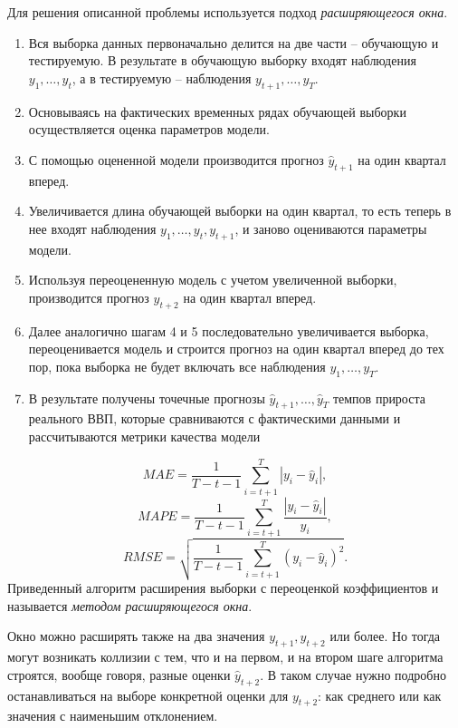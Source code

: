 \documentclass[a4paper, 14pt]{extreport}
\numberwithin{equation}{section}
\numberwithin{equation}{section}
\begin{document}
	Для решения описанной проблемы используется подход \textit{расширяющегося окна}.
	\begin{enumerate}
		\item Вся выборка данных первоначально делится на две части -- обучающую и тестируемую. В результате в обучающую
		выборку входят наблюдения $y_1,\ldots, y_t$, а в тестируемую -- наблюдения $y_{t+1},\ldots, y_T$.
		\item Основываясь на фактических временных рядах обучающей выборки осуществляется
		оценка параметров модели.
		\item С помощью оцененной модели производится прогноз $\hat y_{t+1}$ на один квартал вперед.
		\item Увеличивается длина обучающей выборки на один квартал, то есть теперь в нее входят наблюдения $y_1,\ldots, y_t, y_{t+1}$, и заново оцениваются
		параметры модели.
		\item Используя переоцененную модель с учетом увеличенной выборки, производится прогноз $\hat y_{t+2}$ на один квартал вперед.
		\item Далее аналогично шагам 4 и 5 последовательно увеличивается выборка, переоценивается модель и строится прогноз на один квартал вперед до тех пор, пока выборка не будет включать все наблюдения $y_{1},\ldots, y_T$.
		\item В результате получены точечные прогнозы $\hat y_{t+1},\ldots, \hat y_T$ темпов прироста реального ВВП, которые сравниваются с фактическими данными и рассчитываются метрики качества модели
	\end{enumerate}
		\begin{equation*}
		MAE = \dfrac{1}{T - t - 1} \sum_{i=t+1}^{T}|y_{i} - \hat y_{i}|,
	\end{equation*}
	\begin{equation*}
		MAPE = \dfrac{1}{T - t - 1} \sum_{i=t+1}^{T}\dfrac{|y_{i} - \hat y_{i}|}{y_i},
	\end{equation*}
	\begin{equation*}
		RMSE = \sqrt{\dfrac{1}{T - t - 1} \sum_{i=t+1}^{T}(y_{i} - \hat y_{i})^2}.
	\end{equation*}
	Приведенный алгоритм расширения выборки с переоценкой коэффициентов и называется \textit{методом расширяющегося окна}.
	
	Окно можно расширять также на два значения $y_{t+1}, y_{t+2}$ или более. Но тогда могут возникать коллизии с тем, что и на первом, и на втором шаге алгоритма строятся, вообще говоря, разные оценки $\hat y_{t+2}$. В таком случае нужно подробно останавливаться на выборе конкретной оценки для $y_{t+2}$: как среднего или как значения с наименьшим отклонением.
	
\end{document}
